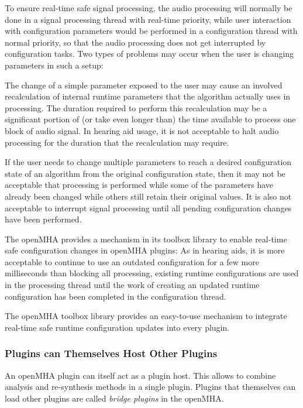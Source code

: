 To ensure real-\/time safe signal processing, the audio processing will normally be done in a signal processing thread with real-\/time priority, while user interaction with configuration parameters would be performed in a configuration thread with normal priority, so that the audio processing does not get interrupted by configuration tasks. Two types of problems may occur when the user is changing parameters in such a setup:
\begin{DoxyItemize}
\item The change of a simple parameter exposed to the user may cause an involved recalculation of internal runtime parameters that the algorithm actually uses in processing. The duration required to perform this recalculation may be a significant portion of (or take even longer than) the time available to process one block of audio signal. In hearing aid usage, it is not acceptable to halt audio processing for the duration that the recalculation may require.
\item If the user needs to change multiple parameters to reach a desired configuration state of an algorithm from the original configuration state, then it may not be acceptable that processing is performed while some of the parameters have already been changed while others still retain their original values. It is also not acceptable to interrupt signal processing until all pending configuration changes have been performed.
\end{DoxyItemize}The openMHA provides a mechanism in its toolbox library to enable real-\/time safe configuration changes in openMHA plugins:
As in hearing aids, it is more acceptable to continue to use an outdated configuration for a few more milliseconds than blocking all processing, existing runtime configurations are used in the processing thread until the work of creating an updated runtime configuration has been completed in the configuration thread.

The openMHA toolbox library provides an easy-\/to-\/use mechanism to integrate real-\/time safe runtime configuration updates into every plugin.\subsubsection{Plugins can Themselves Host Other Plugins}\label{index_bridge}
An openMHA plugin can itself act as a plugin host. This allows to combine analysis and re-\/synthesis methods in a single plugin. Plugins that themselves can load other plugins are called \emph{bridge plugins} in the openMHA.

